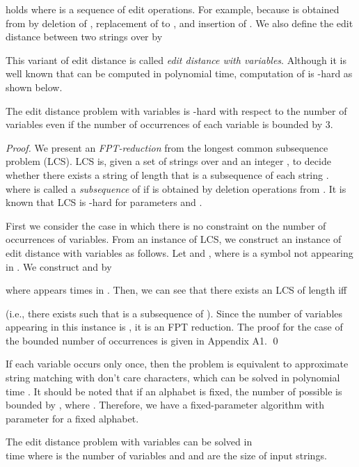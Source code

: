 \documentclass[a4paper]{llncs}
\begin{document}
holds where  is a sequence of edit operations.
For example,  because  is obtained from
 by deletion of , replacement of  to , and insertion of . 
We also define the edit distance 
between two strings over 
by

This variant of edit distance is called \emph{edit distance with variables}.
Although it is well known that  can be computed
in polynomial time, computation of  is -hard
as shown below.

\begin{theorem}
The edit distance problem with variables is -hard with respect to
the number of variables even if the number of occurrences of each variable
is bounded by 3.
\label{thm:edhard}
\end{theorem}
\begin{proof}
We present an \emph{FPT-reduction} \cite{flum06}
from the longest common subsequence problem (LCS).
LCS is, given a set of strings  over  and 
an integer ,
to decide whether there exists a string  of length 
that is a subsequence of each string .
where  is called a \emph{subsequence} of  if  is obtained by
deletion operations from .
It is known that LCS is -hard
for parameters  and  \cite{bodlaender95}.

First we consider the case in which there is no constraint on the number
of occurrences of variables.
From an instance of LCS, we construct an instance of
edit distance with variables as follows.
Let  and ,
where  is a symbol not appearing in .
We construct  and  by

where  appears  times in .
Then, we can see that
there exists an LCS of length  iff

(i.e., there exists  such that  is a subsequence of
).
Since the number of variables appearing in this instance is ,
it is an FPT reduction.
The proof for the case of the bounded number of occurrences 
is given in Appendix A1.
\qed
\end{proof}

If each variable occurs only once, then the problem is equivalent
to approximate string matching with don't care characters,
which can be solved in polynomial time \cite{akutsu95}.
It should be noted that if an alphabet  is fixed,
the number of possible  is bounded by ,
where .
Therefore, we have a fixed-parameter algorithm with parameter 
for a fixed alphabet.

\begin{proposition}
The edit distance problem with variables can be solved in\\
 time where  is the number of variables
and  and  are the size of input strings.
\end{proposition}
\end{document}

